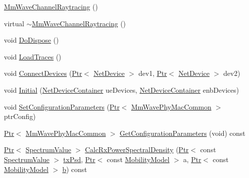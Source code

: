\begin{DoxyCompactItemize}
\item 
\hyperlink{classns3_1_1MmWaveChannelRaytracing_a589ce99d5245ae888be89e61a81a781d}{Mm\+Wave\+Channel\+Raytracing} ()
\item 
virtual \hyperlink{classns3_1_1MmWaveChannelRaytracing_a992e7f43cb5a3e5585872808fbf6caad}{$\sim$\+Mm\+Wave\+Channel\+Raytracing} ()
\item 
void \hyperlink{classns3_1_1MmWaveChannelRaytracing_a6d28926731bb6ee573eb3b7e431f2643}{Do\+Dispose} ()
\item 
void \hyperlink{classns3_1_1MmWaveChannelRaytracing_ac651f8bb2239af97faa8f524d4c9f0e9}{Load\+Traces} ()
\item 
void \hyperlink{classns3_1_1MmWaveChannelRaytracing_a8f1e187d23f0de1b906d97eab364e3b5}{Connect\+Devices} (\hyperlink{classns3_1_1Ptr}{Ptr}$<$ \hyperlink{classns3_1_1NetDevice}{Net\+Device} $>$ dev1, \hyperlink{classns3_1_1Ptr}{Ptr}$<$ \hyperlink{classns3_1_1NetDevice}{Net\+Device} $>$ dev2)
\item 
void \hyperlink{classns3_1_1MmWaveChannelRaytracing_a4d9bc726032d2738fb159b432816018d}{Initial} (\hyperlink{classns3_1_1NetDeviceContainer}{Net\+Device\+Container} ue\+Devices, \hyperlink{classns3_1_1NetDeviceContainer}{Net\+Device\+Container} enb\+Devices)
\item 
void \hyperlink{classns3_1_1MmWaveChannelRaytracing_a29703c1f21c01890dfad7d9a9dddae26}{Set\+Configuration\+Parameters} (\hyperlink{classns3_1_1Ptr}{Ptr}$<$ \hyperlink{classns3_1_1MmWavePhyMacCommon}{Mm\+Wave\+Phy\+Mac\+Common} $>$ ptr\+Config)
\item 
\hyperlink{classns3_1_1Ptr}{Ptr}$<$ \hyperlink{classns3_1_1MmWavePhyMacCommon}{Mm\+Wave\+Phy\+Mac\+Common} $>$ \hyperlink{classns3_1_1MmWaveChannelRaytracing_a6c66dffe14fe7f93785c95eba58e6e96}{Get\+Configuration\+Parameters} (void) const 
\item 
\hyperlink{classns3_1_1Ptr}{Ptr}$<$ \hyperlink{classns3_1_1SpectrumValue}{Spectrum\+Value} $>$ \hyperlink{classns3_1_1MmWaveChannelRaytracing_a05ab8d0eec036305bde7d2de74de6403}{Calc\+Rx\+Power\+Spectral\+Density} (\hyperlink{classns3_1_1Ptr}{Ptr}$<$ const \hyperlink{classns3_1_1SpectrumValue}{Spectrum\+Value} $>$ \hyperlink{lte__link__budget__x2__handover__measures_8m_a684fe3101a5e48a5fcc57cab8dbcd1aa}{tx\+Psd}, \hyperlink{classns3_1_1Ptr}{Ptr}$<$ const \hyperlink{classns3_1_1MobilityModel}{Mobility\+Model} $>$ a, \hyperlink{classns3_1_1Ptr}{Ptr}$<$ const \hyperlink{classns3_1_1MobilityModel}{Mobility\+Model} $>$ \hyperlink{lte__pathloss_8m_a21ad0bd836b90d08f4cf640b4c298e7c}{b}) const 
\end{DoxyCompactItemize}
